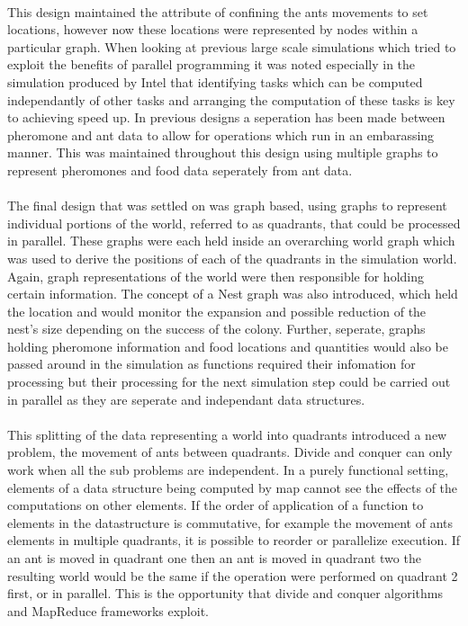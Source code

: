 \documentclass[main.tex]{subfiles}
\begin{document}
\paragraph{}This design maintained the attribute of confining the ants movements to set locations, however now these locations were represented by nodes within a particular graph. When looking at previous large scale simulations which tried to exploit the benefits of parallel programming it was noted especially in the simulation produced by Intel that identifying tasks which can be computed independantly of other tasks and arranging the computation of these tasks is key to achieving speed up. In previous designs a seperation has been made between pheromone and ant data to allow for operations which run in an embarassing manner. This was maintained throughout this design using multiple graphs to represent pheromones and food data seperately from ant data.

\paragraph{}The final design that was settled on was graph based, using graphs to represent individual portions of the world, referred to as quadrants, that could be processed in parallel. These graphs were each held inside an overarching world graph which was used to derive the positions of each of the quadrants in the simulation world. Again, graph representations of the world were then responsible for holding certain information. The concept of a Nest graph was also introduced, which held the location and would monitor the expansion and possible reduction of the nest's size depending on the success of the colony. Further, seperate, graphs holding pheromone information and food locations and quantities would also be passed around in the simulation as functions required their infomation for processing but their processing for the next simulation step could be carried out in parallel as they are seperate and independant data structures.

\paragraph{}This splitting of the data representing a world into quadrants introduced a new problem, the movement of ants between quadrants. Divide and conquer can only work when all the sub problems are independent. In a purely functional setting, elements of a data structure being computed by map cannot see the effects of the computations on other elements. If the order of application of a function to elements in the datastructure is commutative, for example the movement of ants elements in multiple quadrants, it is possible to reorder or parallelize execution. If an ant is moved in quadrant one then an ant is moved in quadrant two the resulting world would be the same if the operation were performed on quadrant 2 first, or in parallel. This is the opportunity that divide and conquer algorithms and MapReduce frameworks exploit.
\end{document}
